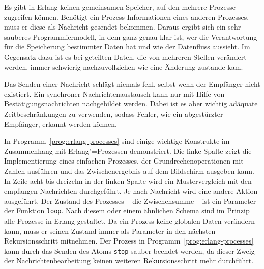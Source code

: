 Es gibt in Erlang keinen gemeinsamen Speicher, auf den mehrere Prozesse zugreifen können. Benötigt ein Prozess Informationen eines anderen Prozesses, muss er diese als Nachricht gesendet bekommen. Daraus ergibt sich ein sehr sauberes Programmiermodell, in dem ganz genau klar ist, wer die Verantwortung für die Speicherung bestimmter Daten hat und wie der Datenfluss aussieht. Im Gegensatz dazu ist es bei geteilten Daten, die von mehreren Stellen verändert werden, immer schwierig nachzuvollziehen wie eine Änderung zustande kam.

Das Senden einer Nachricht schlägt niemals fehl, selbst wenn der Empfänger nicht existiert. Ein synchroner Nachrichtenaustausch kann nur mit Hilfe von Bestätigungsnachrichten nachgebildet werden. Dabei ist es aber wichtig adäquate Zeitbeschränkungen zu verwenden, sodass Fehler, wie \zB ein abgestürzter Empfänger, erkannt werden können.

In Programm~\ref{prog:erlang-processes} sind einige wichtige Konstrukte im Zusammenhang mit Erlang"=Prozessen demonstriert. Die linke Spalte zeigt die Implementierung eines einfachen Prozesses, der Grundrechenoperationen mit Zahlen ausführen und das Zwischenergebnis auf dem Bildschirm ausgeben kann. In Zeile acht bis dreizehn in der linken Spalte wird ein Mustervergleich mit den empfangen Nachrichten durchgeführt. Je nach Nachricht wird eine andere Aktion ausgeführt. Der Zustand des Prozesses -- die Zwischensumme -- ist ein Parameter der Funktion \lstinline{loop}. Nach diesem oder einem ähnlichen Schema sind im Prinzip alle Prozesse in Erlang gestaltet. Da ein Prozess keine globalen Daten verändern kann, muss er seinen Zustand immer als Parameter in den nächsten Rekursionsschritt mitnehmen. Der Prozess in Programm~\ref{prog:erlang-processes} kann durch das Senden des Atoms \lstinline{stop} sauber beendet werden, da dieser Zweig der Nachrichtenbearbeitung keinen weiteren Rekursionsschritt mehr durchführt.

